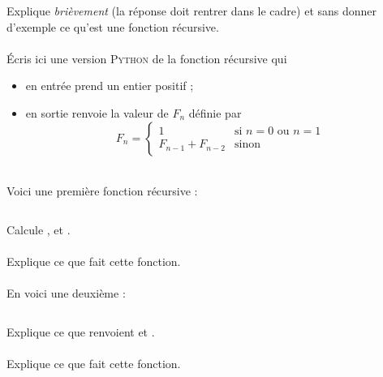 \documentclass[a4paper,12pt,eval]{nsi}
\begin{document}
\maketitle


\question Explique \textit{brièvement} (la réponse doit rentrer dans le cadre) et sans donner d'exemple ce qu'est une fonction récursive.\\

\\

\question \'Ecris ici une version \textsc{Python} de la fonction récursive  qui
\begin{itemize}
	\item 	en entrée prend un entier positif ;
	\item 	en sortie renvoie la valeur de $F_n$ définie par $$F_n=\begin{cases}
		1 & \mbox{si } n=0\mbox{ ou }n=1\\
		F_{n-1}+F_{n-2} &\mbox{sinon}
	\end{cases}$$
\end{itemize}

\\

\question Voici une première fonction récursive :
\inputminted{python}{scripts/mystere1.py}
Calcule ,   et . \bareme{1pt}\\

\\

Explique ce que fait cette fonction.\\

\\
\newpage
\question En voici une deuxième :
\inputminted{python}{scripts/mystere2.py}
Explique ce que renvoient  et .\bareme{1pt}\\

\\

Explique ce que fait cette fonction.\\

\end{document}
